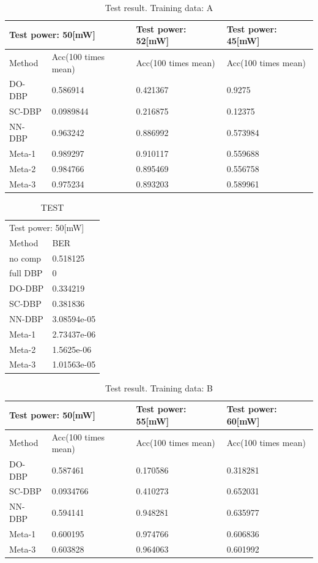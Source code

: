 \begin{table}[htbp]
\centering
\begin{tabular}{llll}
\hline
\multicolumn{2}{l}{Test power: 50[mW]} & Test power: 52[mW] & Test power: 45[mW] \\
\hline
Method & Acc(100 times mean)  & Acc(100 times mean)  & Acc(100 times mean)\\
    DO-DBP  &  0.586914   &    0.421367  &    0.9275  \\
    SC-DBP  &  0.0989844  &   0.216875  &   0.12375 \\
    NN-DBP  &  0.963242   &   0.886992  &   0.573984 \\
    Meta-1  &  0.989297   &   0.910117   &   0.559688 \\
    Meta-2  &  0.984766   &   0.895469   &   0.556758 \\
    Meta-3  &  0.975234   &   0.893203 &   0.589961 \\
    \hline
\end{tabular}
\caption{Test result. Training data: A}
\label{A table}
\end{table}

\begin{table}[htbp]
  \centering
  \begin{tabular}{ll}
  \hline
  \multicolumn{2}{l}{Test power: 50[mW]}\\
  Method    &    BER    \\
   no comp  &   0.518125 \\
  full DBP  &   0 \\
    DO-DBP  &   0.334219 \\
    SC-DBP  &   0.381836 \\
    NN-DBP  &   3.08594e-05 \\
    Meta-1  &   2.73437e-06 \\
    Meta-2  &   1.5625e-06 \\
    Meta-3  &   1.01563e-05 \\
      \hline
  \end{tabular}
  \caption{TEST}
  \label{test test}
  \end{table}

\begin{table}[htbp]
  \centering
  \begin{tabular}{llll}
  \hline
  \multicolumn{2}{l}{Test power: 50[mW]} & Test power: 55[mW] & Test power: 60[mW] \\
  \hline
  Method & Acc(100 times mean)   & Acc(100 times mean)  & Acc(100 times mean)\\
      DO-DBP  &  0.587461  &   0.170586  &   0.318281 \\
      SC-DBP  &   0.0934766  &   0.410273  &    0.652031 \\
      NN-DBP  &   0.594141 &   0.948281  &   0.635977\\
      Meta-1  & 0.600195 &    0.974766  &    0.606836\\
      Meta-3  &  0.603828  &    0.964063  &   0.601992 \\
      \hline
  \end{tabular}
  \caption{Test result. Training data: B}
  \label{B table}
  \end{table}

